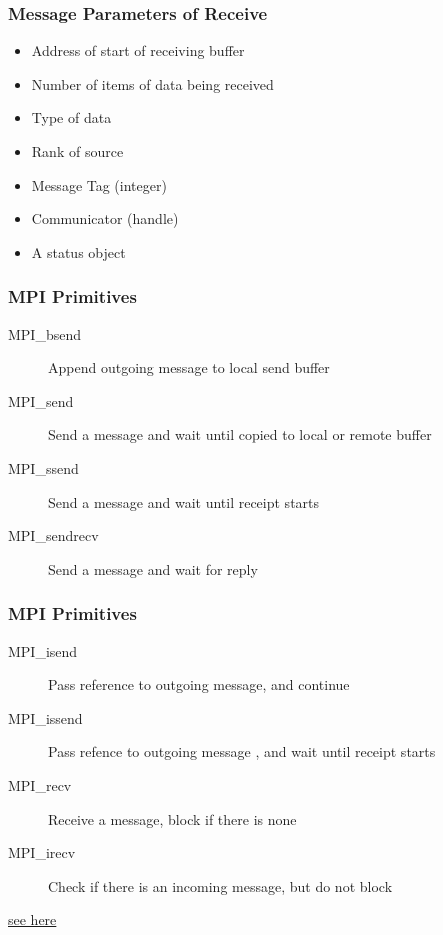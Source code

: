 \documentclass{beamer}
\begin{document}
                  \begin{frame}
                  	\frametitle{Message Parameters of Receive}
                  	\begin{itemize}
                  		\item Address of start of receiving buffer
                  		\item Number of items of data being received 
                  		\item Type of data
                  		\item Rank of source
                  		\item Message Tag (integer)
                  		\item Communicator (handle)
                  		\item A status object
                  	\end{itemize}
                  	
                  \end{frame} 
      \begin{frame}
      	\frametitle{MPI Primitives}
      	\begin{description}
      		\item[MPI\_bsend] Append outgoing message to local send buffer
      		\item[MPI\_send] Send a message and wait until copied to local or remote buffer
      		\item[MPI\_ssend] Send a message and wait until receipt starts
      		\item[MPI\_sendrecv] Send a message and wait for reply
      	\end{description}
      \end{frame}
      \begin{frame}
      	\frametitle{MPI Primitives}
      	\begin{description}
      		\item[MPI\_isend] Pass reference to outgoing message, and continue
      		\item[MPI\_issend] Pass refence to outgoing message , and wait until receipt starts
      		\item[MPI\_recv] Receive a message, block if there is none
      		\item[MPI\_irecv] Check if there is an incoming message, but do not block
      	\end{description}
      	\href{http://materials.jeremybejarano.com/MPIwithPython/introMPI.html}{see here}
      \end{frame} 


        
\end{document}
